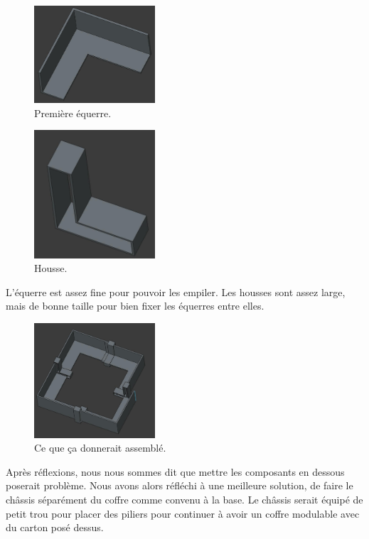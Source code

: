 \documentclass[a4paper,12pt]{report}  %
\begin{document}
\begin{figure}[H]
	\centering
	\includegraphics[width=0.4\textwidth]{./attachments/cad_equerre.jpg}
	\caption{Première équerre.}
\end{figure}

\begin{figure}[H]
	\centering
	\includegraphics[width=0.4\textwidth]{./attachments/cad_housse.jpg}
	\caption{Housse.}
\end{figure}

L’équerre est assez fine pour pouvoir les empiler. Les housses sont assez large, mais de bonne taille pour bien fixer les équerres entre elles.

\begin{figure}[H]
	\centering
	\includegraphics[width=0.4\textwidth]{./attachments/cad_assemblage.jpg}
	\caption{Ce que ça donnerait assemblé.}
\end{figure}

Après réflexions, nous nous sommes dit que mettre les composants en dessous poserait problème. Nous avons alors réfléchi à une meilleure solution, de faire le châssis séparément du coffre comme convenu à la base. Le châssis serait équipé de petit trou pour placer des piliers pour continuer à avoir un coffre modulable avec du carton posé dessus. 
\end{document}
